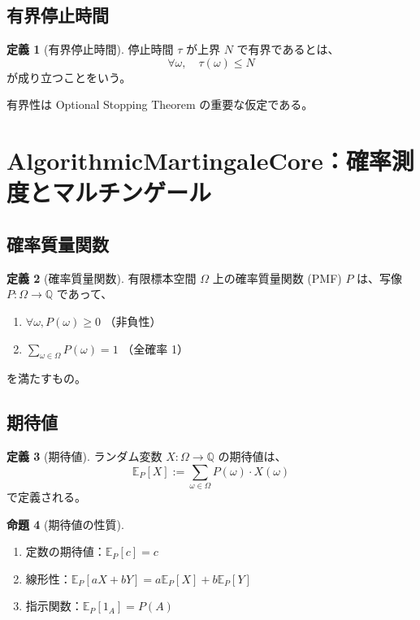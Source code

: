 \documentclass[a4paper,12pt]{ltjsarticle}
\theoremstyle{definition}
\newtheorem{definition}{定義}[section]
\newtheorem{proposition}[definition]{命題}
\begin{document}
\subsection{有界停止時間}

\begin{definition}[有界停止時間]
停止時間 $\tau$ が上界 $N$ で有界であるとは、
\[
\forall \omega, \quad \tau(\omega) \leq N
\]
が成り立つことをいう。
\end{definition}

有界性は Optional Stopping Theorem の重要な仮定である。

\section{AlgorithmicMartingaleCore：確率測度とマルチンゲール}

\subsection{確率質量関数}

\begin{definition}[確率質量関数]
有限標本空間 $\Omega$ 上の確率質量関数 (PMF) $P$ は、写像 $P : \Omega \to \mathbb{Q}$ であって、
\begin{enumerate}
\item $\forall \omega, P(\omega) \geq 0$ （非負性）
\item $\sum_{\omega \in \Omega} P(\omega) = 1$ （全確率 1）
\end{enumerate}
を満たすもの。
\end{definition}

\subsection{期待値}

\begin{definition}[期待値]
ランダム変数 $X : \Omega \to \mathbb{Q}$ の期待値は、
\[
\mathbb{E}_P[X] := \sum_{\omega \in \Omega} P(\omega) \cdot X(\omega)
\]
で定義される。
\end{definition}

\begin{proposition}[期待値の性質]
\begin{enumerate}
\item 定数の期待値：$\mathbb{E}_P[c] = c$
\item 線形性：$\mathbb{E}_P[aX + bY] = a\mathbb{E}_P[X] + b\mathbb{E}_P[Y]$
\item 指示関数：$\mathbb{E}_P[1_A] = P(A)$
\end{enumerate}
\end{proposition}
\end{document}
